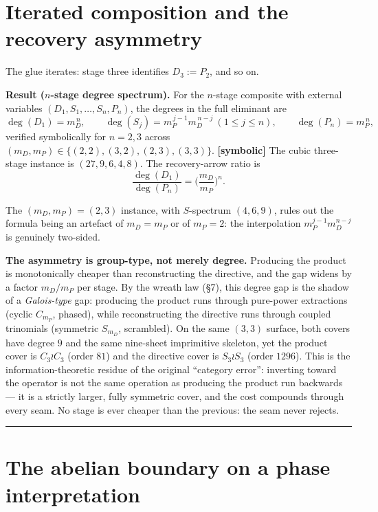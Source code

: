 \documentclass[11pt]{article}
\theoremstyle{plain}
\theoremstyle{definition}
\theoremstyle{remark}
\begin{document}
\hypertarget{iterated-composition-and-the-recovery-asymmetry}{%
\section{Iterated composition and the recovery asymmetry}\label{iterated-composition-and-the-recovery-asymmetry}}

The glue iterates: stage three identifies \(D_3 := P_2\), and so on.

\textbf{Result (\(n\)-stage degree spectrum).} For the \(n\)-stage composite with external variables \((D_1,S_1,\dots,S_n,P_n)\), the degrees in the full eliminant are \[
\deg(D_1) = m_D^{\,n},\qquad \deg(S_j) = m_P^{\,j-1} m_D^{\,n-j}\ (1\le j\le n),\qquad \deg(P_n) = m_P^{\,n},
\] verified symbolically for \(n=2,3\) across \((m_D,m_P)\in\{(2,2),(3,2),(2,3),(3,3)\}\). \textbf{{[}symbolic{]}} The cubic three-stage instance is \((27,9,6,4,8)\). The recovery-arrow ratio is \[
\frac{\deg(D_1)}{\deg(P_n)} = \Big(\frac{m_D}{m_P}\Big)^{\!n}.
\]

The \((m_D,m_P)=(2,3)\) instance, with \(S\)-spectrum \((4,6,9)\), rules out the formula being an artefact of \(m_D=m_P\) or of \(m_P=2\): the interpolation \(m_P^{j-1}m_D^{n-j}\) is genuinely two-sided.

\textbf{The asymmetry is group-type, not merely degree.} Producing the product is monotonically cheaper than reconstructing the directive, and the gap widens by a factor \(m_D/m_P\) per stage. By the wreath law (§7), this degree gap is the shadow of a \emph{Galois-type} gap: producing the product runs through pure-power extractions (cyclic \(C_{m_P}\), phased), while reconstructing the directive runs through coupled trinomials (symmetric \(S_{m_D}\), scrambled). On the same \((3,3)\) surface, both covers have degree \(9\) and the same nine-sheet imprimitive skeleton, yet the product cover is \(C_3\wr C_3\) (order \(81\)) and the directive cover is \(S_3\wr S_3\) (order \(1296\)). This is the information-theoretic residue of the original ``category error'': inverting toward the operator is not the same operation as producing the product run backwards --- it is a strictly larger, fully symmetric cover, and the cost compounds through every seam. No stage is ever cheaper than the previous: the seam never rejects.

\begin{center}\rule{0.5\linewidth}{0.5pt}\end{center}

\hypertarget{the-abelian-boundary-on-a-phase-interpretation}{%
\section{The abelian boundary on a phase interpretation}\label{the-abelian-boundary-on-a-phase-interpretation}}
\end{document}
